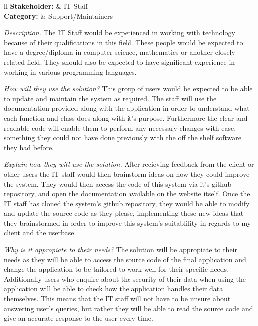 \noindent
\begin{tblr}{ll}
  \textsf{\bfseries Stakeholder: } & IT Staff\\
  \textsf{\bfseries Category: } & Support/Maintainers\\
\end{tblr}
\vspace{0.2cm}

\textit{Description.}
The IT Staff would be experienced in working with technology
because of their qualifications in this field. These people 
would be expected to have a degree/diploma in computer science,
mathematics or another closely related field. They should also 
be expected to have significant experience in working in 
various programming languages. \vspace{0.2cm}

\textit{How will they use the solution?}
This group of users would be expected to be able to update and
maintain the system as required. The staff will use the
documentation provided along with the application in order to
understand what each function and class does along with it's
purpose. Furthermore the clear and readable code will enable
them to perform any necessary changes with ease, something
they could not have done previously with the off the shelf
software they had before. \vspace{0.2cm}

\textit{Explain how they will use the solution.}
After recieving feedback from the client or other users the 
IT staff would then brainstorm ideas on how they could 
improve the system. They would then access the code of this
system via it's github repository, and open the documentation
available on the website itself. Once the IT staff has cloned
the system's github repository, they would be able to modify 
and update the source code as they please, implementing these 
new ideas that they brainstormed in order to improve this
system's suitablility in regards to my client and the userbase. 
\vspace{0.2cm}

\textit{Why is it appropiate to their needs?}
The solution will be appropiate to their needs as they will be
able to access the source code of the final application and 
change the application to be tailored to work well for their 
specific needs. Additionally users who enquire about the 
security of their data when using the application will be able
to check how the application handles their data themselves.
This means that the IT staff will not have to be unsure about
answering user's queries, but rather they will be able to read
the source code and give an accurate response to the user every
time.

